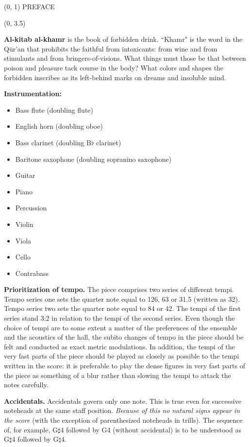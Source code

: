 \documentclass[10pt]{article}
\begin{document}
\begin{textblock}{23}(0, 1)
\center \huge PREFACE
\end{textblock}

\begin{textblock}{23}(0, 3.5)

\textbf{Al-kitab al-khamr} is the book of forbidden drink. ``Khamr" is the word
in the Q\={u}r'an that prohibits the faithful from intoxicants: from wine and
from stimulants and from bringers-of-visions. What things must those be that
between poison and pleasure tack course in the body? What colors and shapes the
forbidden inscribes as its left-behind marks on dreams and insoluble mind.

\textbf{Instrumentation:}

\begin{itemize} \itemsep2pt
\item Bass flute (doubling flute)
\item English horn (doubling oboe)
\item Bass clarinet (doubling B$\flat$ clarinet)
\item Baritone saxophone (doubling sopranino saxophone)
\item Guitar
\item Piano
\item Percussion
\item Violin
\item Viola
\item Cello
\item Contrabass
\end{itemize}


\textbf{Prioritization of tempo.} The piece comprises two series of different
tempi. Tempo series one sets the quarter note equal to 126, 63 or 31.5 (written
as 32). Tempo series two sets the quarter note equal to 84 or 42. The tempi of
the first series stand 3:2 in relation to the tempi of the second series.
Even though the choice of tempi are to some extent a matter of the preferences
of the ensemble and the acoustics of the hall, the subito changes of tempo in
the piece should be felt and conducted as exact metric modulations. In
addition, the tempi of the very fast parts of the piece should be played as
closely as possible to the tempi written in the score: it is preferable to play
the dense figures in very fast parts of the piece as something of a blur rather
than slowing the tempi to attack the notes carefully.

\textbf{Accidentals.} Accidentals govern only one note. This is true even for
successive noteheads at the same staff position. \textit{Because of this no
natural signs appear in the score} (with the exception of parenthesized
noteheads in trills). The sequence of, for example, G$\sharp$4 followed by
G4 (without accidental) is to be understood as G$\sharp$4 followed by
G$\natural$4.


\end{textblock}
\end{document}
